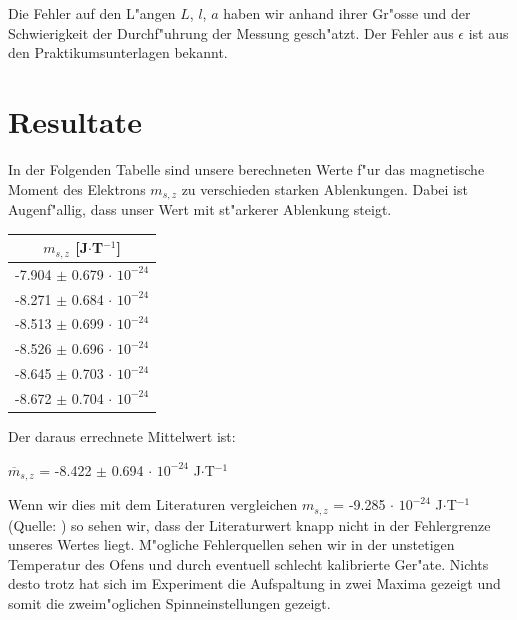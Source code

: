 \documentclass[a4paper,parskip,11pt, DIV12]{scrreprt}
\begin{document}
Die Fehler auf den L"angen $L$, $l$, $a$ haben wir anhand ihrer Gr"osse und der Schwierigkeit der Durchf"uhrung der Messung gesch"atzt. Der Fehler aus $\epsilon$ ist aus den Praktikumsunterlagen bekannt.
\clearpage

\chapter{Resultate}

In der Folgenden Tabelle sind unsere berechneten Werte f"ur das magnetische Moment des Elektrons $m_{s,z}$ zu verschieden starken Ablenkungen. Dabei ist Augenf"allig, dass unser Wert mit st"arkerer Ablenkung steigt. 

\begin{table}[H]
\centering
\renewcommand{\arraystretch}{1.2} %
\setlength{\tabcolsep}{3mm} %
\begin{tabular}{c}
$m_{s,z}$ [J$\cdot$T$^{-1}$] \\ \hline
-7.904 $\pm$ 0.679 $\cdot$ $10^{-24}$\\
-8.271 $\pm$ 0.684 $\cdot$ $10^{-24}$\\
-8.513 $\pm$ 0.699 $\cdot$ $10^{-24}$\\
-8.526 $\pm$ 0.696 $\cdot$ $10^{-24}$\\
-8.645 $\pm$ 0.703 $\cdot$ $10^{-24}$\\
-8.672 $\pm$ 0.704 $\cdot$ $10^{-24}$\\
\end{tabular}
\end{table} 

Der daraus errechnete Mittelwert ist:\\
\begin{center}
\begin{large}
 $\overline{m}_{s,z}$ = -8.422 $\pm$ 0.694 $\cdot$ $10^{-24}$ J$\cdot$T$^{-1}$\\
 \end{large}
\end{center}

Wenn wir dies mit dem Literaturen vergleichen $m_{s,z}$ = -9.285 $\cdot$ $10^{-24}$ J$\cdot$T$^{-1}$   (Quelle: {\footnotesize \cite{https://en.wikipedia.org} }) so sehen wir, dass der Literaturwert knapp nicht in der Fehlergrenze unseres Wertes liegt. M"ogliche Fehlerquellen sehen wir in der unstetigen Temperatur des Ofens und durch eventuell schlecht kalibrierte Ger"ate. Nichts desto trotz hat sich im Experiment die Aufspaltung in zwei Maxima gezeigt und somit die zweim"oglichen Spinneinstellungen gezeigt.
\end{document}
